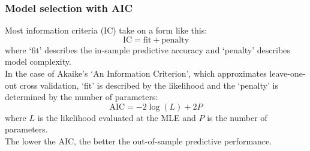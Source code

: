 \documentclass[color=usenames,dvipsnames]{beamer}\usepackage[]{graphicx}\usepackage[]{color}
\begin{document}
\begin{frame}
  \frametitle{Model selection with AIC}
  \small
  Most information criteria (IC) take on a form like this:
  \[
     \mathrm{IC} = \mathrm{fit} + \mathrm{penalty}
  \]
  where `fit' describes the \alert{in-sample} predictive accuracy and 
  `penalty' describes model complexity. \\
  \pause
  \vfill
  In the case of Akaike's `An Information Criterion', which
  approximates leave-one-out cross validation, `fit' is described by
  the likelihood and the `penalty' is determined by the number of parameters:
  \[
     \mathrm{AIC} = -2 \log(L) + 2P 
   \]
   where $L$ is the likelihood evaluated at the MLE and $P$ is
   the number of parameters. \\
   \pause
   \vfill
   The lower the AIC, the better the \alert{out-of-sample} predictive
   performance.
\end{frame}




\end{document}
